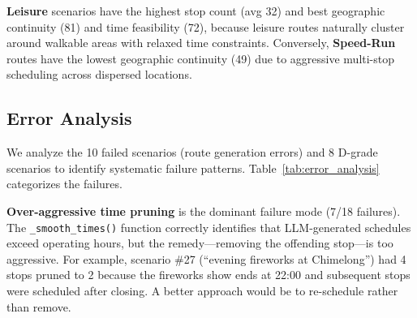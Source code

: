 \textbf{Leisure} scenarios have the highest stop count (avg 32) and best geographic continuity (81) and time feasibility (72), because leisure routes naturally cluster around walkable areas with relaxed time constraints. Conversely, \textbf{Speed-Run} routes have the lowest geographic continuity (49) due to aggressive multi-stop scheduling across dispersed locations.

\subsection{Error Analysis}

We analyze the 10 failed scenarios (route generation errors) and 8 D-grade scenarios to identify systematic failure patterns. Table~\ref{tab:error_analysis} categorizes the failures.

\begin{table}[!t]
\centering
\caption{Failure mode analysis. 10 route generation failures + 8 D-grade scenarios from 100-scenario evaluation.}
\label{tab:error_analysis}
\end{table}

\textbf{Over-aggressive time pruning} is the dominant failure mode (7/18 failures). The \texttt{\_smooth\_times()} function correctly identifies that LLM-generated schedules exceed operating hours, but the remedy---removing the offending stop---is too aggressive. For example, scenario \#27 (``evening fireworks at Chimelong'') had 4 stops pruned to 2 because the fireworks show ends at 22:00 and subsequent stops were scheduled after closing. A better approach would be to re-schedule rather than remove.

